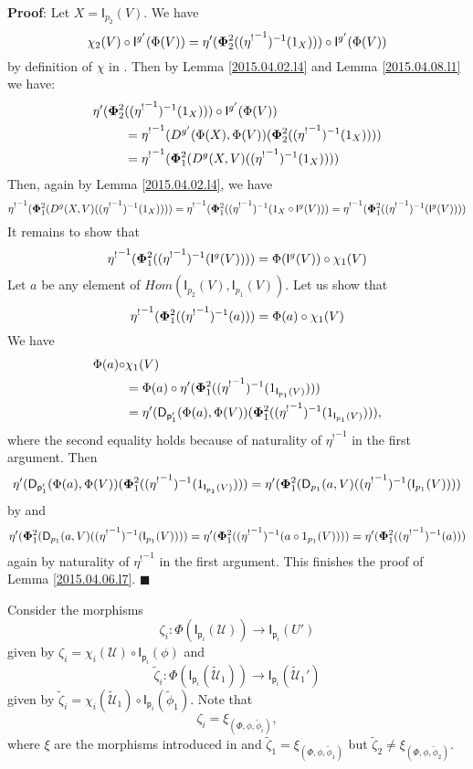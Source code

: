 \documentclass[12pt]{article}
\numberwithin{equation}{section}
\newenvironment{myproof}{{\bf Proof}:}{$\blacksquare$ \vskip 5mm }
\newcommand{\sr}{\rightarrow}
\newcommand{\wt}{\widetilde}
\newcommand{\id}{1}            %
\newcommand{\p}{\mathsf{p}}
\newcommand{\U}{\mathcal{U}}
\newcommand{\D}{\mathsf{D}}
\newcommand{\I}{\mathsf{I}}
\newcommand{\etashriek}{\eta^!}
\newcommand{\etaunshriek}{{\etashriek}^{-1}}
\begin{document}
\begin{myproof}
Let $X=\I_{p_2}(V)$. We have
%
$$\chi_2(V)\circ {\I^{g'}(\Phi(V))}=\eta'({\bf\Phi}_2^2((\etaunshriek)^{-1}(\id_{X})))\circ
\I^{g'}(\Phi(V))$$
%
by definition of $\chi$ in \cite[Construction 5.6]{fromunivwithPi}. Then by
Lemma \ref{2015.04.02.l4} and Lemma \ref{2015.04.08.l1} we have:
%
\begin{align*}
  \eta'({\bf\Phi}_2^2&((\etaunshriek)^{-1}(\id_{X})))\circ \I^{g'}(\Phi(V)) \\
    & = \etaunshriek(D^{g'}(\Phi(X),\Phi(V))({\bf\Phi}_2^2((\etaunshriek)^{-1}(\id_X)))) \\
    & = \etaunshriek({\bf\Phi}_1^2(D^g(X,V)((\etaunshriek)^{-1}(\id_X))))
\end{align*}
%
Then, again by Lemma \ref{2015.04.02.l4}, we have
%
$$\etaunshriek({\bf\Phi}_1^2(D^g(X,V)((\etaunshriek)^{-1}(\id_X))))=\etaunshriek({\bf\Phi}_1^2((\etaunshriek)^{-1}(\id_X\circ
\I^g(V)))=\etaunshriek({\bf\Phi}_1^2((\etaunshriek)^{-1}(\I^g(V))))$$
%
It remains to show that
%
$$\etaunshriek({\bf\Phi}_1^2((\etaunshriek)^{-1}(\I^g(V))))=\Phi(\I^g(V))\circ \chi_1(V)$$
%
Let $a$ be any element of $Hom(\I_{p_2}(V),\I_{p_1}(V))$. Let us show that
%
$$\etaunshriek({\bf\Phi}_1^2((\etaunshriek)^{-1}(a)))=\Phi(a)\circ \chi_1(V)$$
%
We have
%
\begin{align*}
  \Phi(a)\circ & \chi_1(V) \\
    & = \Phi(a)\circ \eta'({\bf\Phi}^2_1((\etaunshriek)^{-1}(\id_{\I_{p_1}(V)}))) \\
    & = \eta'(\D_{\p_1'}(\Phi(a),\Phi(V))({\bf\Phi}^2_1((\etaunshriek)^{-1}(\id_{\I_{p_1}(V)}))),
\end{align*}
%
where the second equality holds because of naturality of $\etaunshriek$ in the first
argument. Then
%
$$\eta'(\D_{\p_1'}(\Phi(a),\Phi(V))({\bf\Phi}^2_1((\etaunshriek)^{-1}(\id_{\I_{p_1}(V)})))=\eta'({\bf\Phi}^2_1(\D_{p_1}(a,V)((\etaunshriek)^{-1}(\I_{p_1}(V))))$$
%
by \cite[Lemma 5.4]{fromunivwithPi} and
%
$$\eta'({\bf\Phi}^2_1(\D_{p_1}(a,V)((\etaunshriek)^{-1}(\I_{p_1}(V))))=\eta'({\bf\Phi}^2_1((\etaunshriek)^{-1}(a\circ
\id_{p_1}(V))))=\eta'({\bf\Phi}_1^2((\etaunshriek)^{-1}(a)))$$
%
again by naturality of $\etaunshriek$ in the first argument. This finishes the proof of
Lemma \ref{2015.04.06.l7}.
\end{myproof}




Consider the morphisms
%
$$\zeta_i:\Phi(\I_{\p_i}(\U))\sr \I_{\p_i}(U')$$
%
given by $\zeta_i=\chi_i(\U)\circ \I_{\p_i}(\phi)$ and
%
$$\wt{\zeta}_i:\Phi(\I_{\p_i}(\wt{\U}_1))\sr \I_{\p_i}(\wt{\U}_1')$$
%
given by $\wt{\zeta}_i=\chi_i(\wt{\U}_1)\circ \I_{\p_i}(\wt{\phi}_1)$. Note that
%
$$\zeta_i=\xi_{(\Phi,\phi,\wt{\phi}_i)},$$
%
where $\xi$ are the morphisms introduced in \cite{fromunivwithPi} and
$\wt{\zeta}_1=\xi_{(\Phi,\phi,\wt{\phi}_1)}$ but $\wt{\zeta}_2\ne
\xi_{(\Phi,\phi,\wt{\phi}_2)}$.
\end{document}
